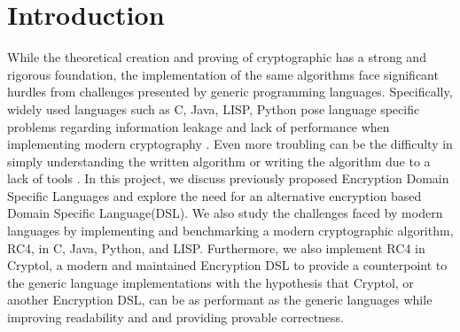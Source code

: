 \section{Introduction}
While the theoretical creation and proving of cryptographic has a strong and rigorous foundation, the implementation of the same algorithms face significant hurdles from challenges presented by generic programming languages. Specifically, widely used languages such as C, Java, LISP, Python pose language specific problems regarding information leakage and lack of performance when implementing modern cryptography \cite{Lewis}. Even more troubling can be the difficulty in simply understanding the written algorithm or writing the algorithm due to a lack of tools \cite{Agosta}. In this project, we discuss previously proposed Encryption Domain Specific Languages and explore the need for an alternative encryption based Domain Specific Language(DSL).  We also study the challenges faced by modern languages by implementing and benchmarking a modern cryptographic algorithm, RC4, in C, Java, Python, and LISP. Furthermore, we also implement RC4 in Cryptol, a modern and maintained Encryption DSL to provide a counterpoint to the generic language implementations with the hypothesis that Cryptol, or another Encryption DSL, can be as performant as the generic languages while improving readability and and providing provable correctness.

